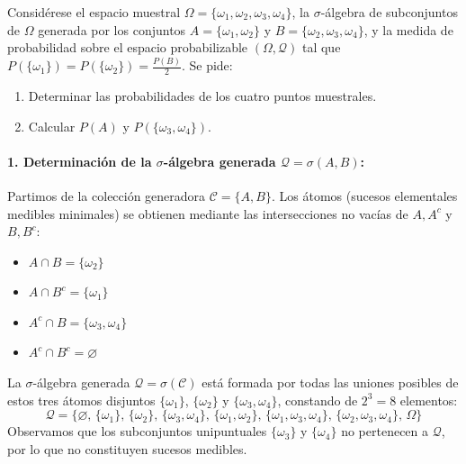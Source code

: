 \begin{problema}
Considérese el espacio muestral $\Omega = \{\omega_1, \omega_2, \omega_3, \omega_4\}$, la $\sigma$-álgebra de subconjuntos de $\Omega$ generada por los conjuntos $A = \{\omega_1, \omega_2\}$ y $B = \{\omega_2, \omega_3, \omega_4\}$, y la medida de probabilidad sobre el espacio probabilizable $(\Omega, \mathcal{Q})$ tal que $P(\{\omega_1\}) = P(\{\omega_2\}) = \frac{P(B)}{2}$. Se pide:
\begin{enumerate}[label=\alph*)]
    \item Determinar las probabilidades de los cuatro puntos muestrales.
    \item Calcular $P(A)$ y $P(\{\omega_3, \omega_4\})$.
\end{enumerate}

\tcblower

\paragraph{1. Determinación de la $\sigma$-álgebra generada $\mathcal{Q} = \sigma(A, B)$:}
Partimos de la colección generadora $\mathcal{C} = \{A, B\}$. Los átomos (sucesos elementales medibles minimales) se obtienen mediante las intersecciones no vacías de $A, A^c$ y $B, B^c$:
\begin{itemize}
    \item $A \cap B = \{\omega_2\}$
    \item $A \cap B^c = \{\omega_1\}$
    \item $A^c \cap B = \{\omega_3, \omega_4\}$
    \item $A^c \cap B^c = \varnothing$
\end{itemize}
La $\sigma$-álgebra generada $\mathcal{Q} = \sigma(\mathcal{C})$ está formada por todas las uniones posibles de estos tres átomos disjuntos $\{\omega_1\}$, $\{\omega_2\}$ y $\{\omega_3, \omega_4\}$, constando de $2^3 = 8$ elementos:
\[
    \mathcal{Q} = \bigl\{ \varnothing, \, \{\omega_1\}, \, \{\omega_2\}, \, \{\omega_3, \omega_4\}, \, \{\omega_1, \omega_2\}, \, \{\omega_1, \omega_3, \omega_4\}, \, \{\omega_2, \omega_3, \omega_4\}, \, \Omega \bigr\}
\]
Observamos que los subconjuntos unipuntuales $\{\omega_3\}$ y $\{\omega_4\}$ no pertenecen a $\mathcal{Q}$, por lo que no constituyen sucesos medibles.


\end{problema}
